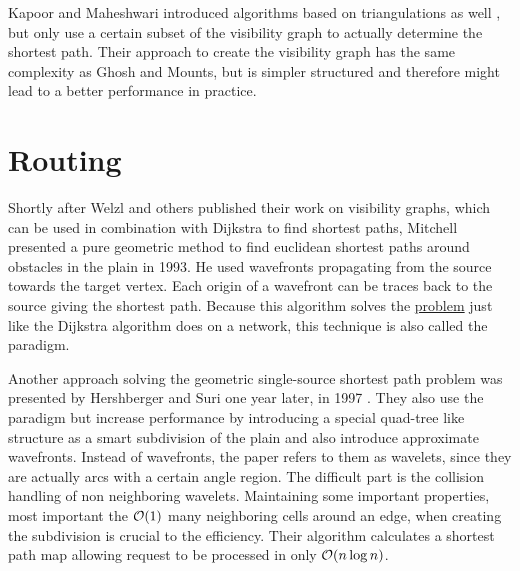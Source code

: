 		Kapoor and Maheshwari introduced algorithms based on triangulations as well \cite{kapoor-shortest-path-vgraph}, but only use a certain subset of the visibility graph to actually determine the shortest path.
		Their approach to create the visibility graph has the same complexity as Ghosh and Mounts, but is simpler structured and therefore might lead to a better performance in practice.
		

\section{Routing}

	\label{related-work:mitchell}
	Shortly after Welzl and others published their work on visibility graphs, which can be used in combination with Dijkstra to find shortest paths, Mitchell presented a pure geometric method to find euclidean shortest paths around obstacles in the plain in 1993\cite{mitchell-shortest-path}.
	He used wavefronts propagating from the source towards the target vertex.
	Each origin of a wavefront can be traces back to the source giving the shortest path.
	Because this algorithm solves the \hyperref[subsubsec:single-source-shortest-path]{ problem} just like the Dijkstra algorithm does on a network, this technique is also called the  paradigm.
	
	Another approach solving the geometric single-source shortest path problem was presented by Hershberger and Suri one year later, in 1997 \cite{hershberger-suri}.
	They also use the  paradigm but increase performance by introducing a special quad-tree like structure as a smart subdivision of the plain and also introduce approximate wavefronts.
	Instead of wavefronts, the paper refers to them as wavelets, since they are actually arcs with a certain angle region.
	The difficult part is the collision handling of non neighboring wavelets.
	Maintaining some important properties, most important the $\mathcal{O}(1)$ many neighboring cells around an edge, when creating the subdivision is crucial to the efficiency.
	Their algorithm calculates a shortest path map allowing request to be processed in only $\mathcal{O}(n \log n)$.
	
